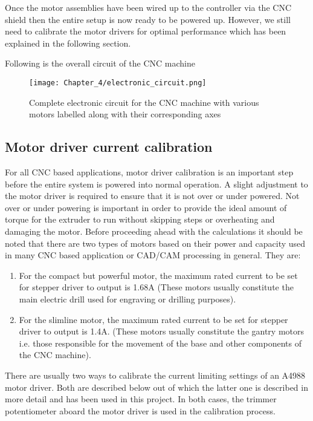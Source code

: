 Once the motor assemblies have been wired up to the controller via the CNC shield then the entire setup is now ready to be powered up. However, we still need to calibrate the motor drivers for optimal performance which has been explained in the following section.

Following is the overall circuit of the CNC machine 

\begin{figure}[h]
    \centering
    \texttt{[image: Chapter\_4/electronic\_circuit.png]}
    \caption{Complete electronic circuit for the CNC machine with various motors labelled along with their corresponding axes}
    \label{fig:electronic_circuit}
\end{figure}


\subsection{Motor driver current calibration} \label{motor_calib}

For all CNC based applications, motor driver calibration is an important step before the entire system is powered into normal operation. A slight adjustment to the motor driver is required to ensure that it is not over or under powered. Not over or under powering is important in order to provide the ideal amount of torque for the extruder to run without skipping steps or overheating and damaging the motor. Before proceeding ahead with the calculations it should be noted that there are two types of motors based on their power and capacity used in many CNC based application or CAD/CAM processing in general. They are:

\begin{enumerate}
 \item For the compact but powerful motor, the maximum rated current to be set for stepper driver to output is 1.68A (These motors usually constitute the main electric drill used for engraving or drilling purposes).
 \item For the slimline motor, the maximum rated current to be set for stepper driver to output is 1.4A. (These motors usually constitute the gantry motors i.e. those responsible for the movement of the base and other components of the CNC machine).
\end{enumerate}

There are usually two ways to calibrate the current limiting settings of an A4988 motor driver. Both are described below out of which the latter one is described in more detail and has been used in this project. In both cases, the trimmer potentiometer aboard the motor driver is used in the calibration process.

